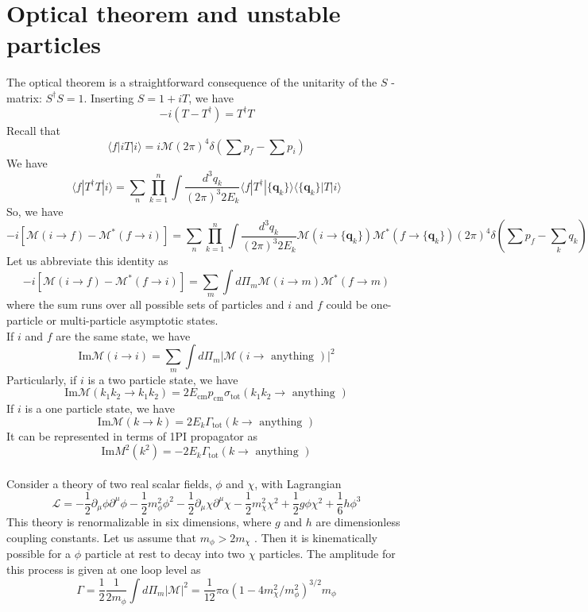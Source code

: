 \section{Optical theorem and unstable particles}
The optical theorem is a straightforward consequence of the unitarity of the $S$ -matrix: $S^{\dagger}S = 1$. 
Inserting $S = 1 + iT$, we have
\[-i(T - T^{\dagger}) = T^{\dagger}T\]
Recall that
\[\langle f | iT | i \rangle = i\mathcal{M}(2\pi)^4\delta(\sum p_f - \sum p_i)\]
We have
\[\langle f | T^{\dagger}T | i \rangle = \sum_n \prod_{k=1}^n \int \frac{d^3q_k}{(2\pi)^3 2E_k} \langle f | T^{\dagger} | \{\bm{q}_k\} \rangle \langle \{\bm{q}_k\} | T | i \rangle\]
So, we have
\[-i[\mathcal{M}(i \to f) - \mathcal{M}^{*}(f \to i)] =  \sum_n \prod_{k=1}^n \int \frac{d^3q_k}{(2\pi)^3 2E_k} \mathcal{M}(i \to \{\bm{q}_k\}) \mathcal{M}^{*}(f \to \{\bm{q}_k\}) (2\pi)^4 \delta(\sum p_f- \sum_k q_k)\]
Let us abbreviate this identity as
\[-i[\mathcal{M}(i \to f) - \mathcal{M}^{*}(f \to i)] = \sum_m \int d\Pi_{m} \mathcal{M}(i \to m) \mathcal{M}^{*}(f \to m)\]
where the sum runs over all possible sets of particles and $i$ and $f$ could be one-particle or multi-particle asymptotic states.
\\
If $i$ and $f$ are the same state, we have
\[\mathrm{Im} \mathcal{M}(i \to i) = \sum_m \int d\Pi_{m} |\mathcal{M}(i \to \mbox{ anything })|^2\]
Particularly, if $i$ is a two particle state, we have
\[\mathrm{Im} \mathcal{M}(k_1k_2 \to k_1k_2) = 2E_{\mathrm{cm}}p_{\mathrm{cm}}\sigma_{\mathrm{tot}}(k_1k_2 \to \mbox{ anything })\]
If $i$ is a one particle state, we have
\[\mathrm{Im} \mathcal{M}(k \to k) = 2E_{k}\Gamma_{\mathrm{tot}}(k \to \mbox{ anything })\]
It can be represented in terms of 1PI propagator as
\[\mathrm{Im} M^2(k^2) = -2E_{k}\Gamma_{\mathrm{tot}}(k \to \mbox{ anything })\]
\\
Consider a theory of two real scalar fields, $\phi$ and $\chi$, with Lagrangian
\[\mathcal{L} = -\frac{1}{2}\partial_{\mu}\phi \partial^{\mu}\phi - \frac{1}{2}m_{\phi}^2\phi^2 -\frac{1}{2}\partial_{\mu}\chi \partial^{\mu}\chi - \frac{1}{2}m_{\chi}^2\chi^2 + \frac{1}{2}g\phi\chi^2 + \frac{1}{6}h\phi^3\]
This theory is renormalizable in six dimensions, where $g$ and $h$ are dimensionless coupling constants. Let us assume that $m_{\phi} > 2m_{\chi}$ . Then it is kinematically possible for a $\phi$ particle at rest to decay into two $\chi$ particles.
The amplitude for this process is given at one loop level as
\[\Gamma = \frac{1}{2} \frac{1}{2m_{\phi}} \int d\Pi_m |\mathcal{M}|^2 = \frac{1}{12} \pi \alpha (1 - 4m_{\chi}^2/m_{\phi}^2)^{3/2}m_{\phi}\]
